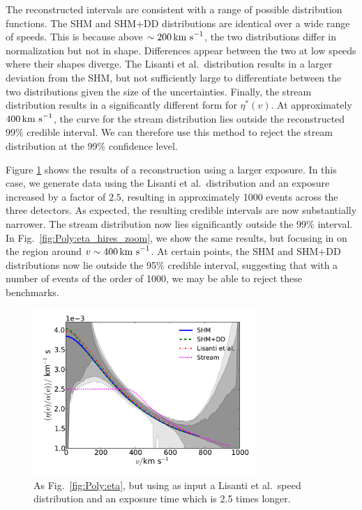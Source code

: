 The reconstructed intervals are consistent with a range of possible distribution functions. The SHM and SHM+DD distributions are identical over a wide range of speeds. This is because above $\sim 200 \,\textrm{km s}^{-1}$, the two distributions differ in normalization but not in shape. Differences appear between the two at low speeds where their shapes diverge. The Lisanti et al.\ distribution results in a larger deviation from the SHM, but not sufficiently large to differentiate between the two distributions given the size of the uncertainties. Finally, the stream distribution results in a significantly different form for $\eta^*(v)$. At approximately $400 \,\textrm{km s}^{-1}$, the curve for the stream distribution lies outside the reconstructed 99\% credible interval. We can therefore use this method to reject the stream distribution at the 99\% confidence level.

Figure \ref{fig:Poly:eta_hires} shows the results of a reconstruction using a larger exposure. In this case, we generate data using the Lisanti et al.\ distribution and an exposure increased by a factor of $2.5$, resulting in approximately 1000 events across the three detectors. As expected, the resulting credible intervals are now substantially narrower. The stream distribution now lies significantly outside the 99\% interval. In Fig.~\ref{fig:Poly:eta_hires_zoom}, we show the same results, but focusing in on the region around $v \sim 400 \,\textrm{km s}^{-1}$. At certain points, the SHM and SHM+DD distributions now lie outside the 95\% credible interval, suggesting that with a number of events of the order of 1000, we may be able to reject these benchmarks.

\begin{figure}[t]
\centering
  \includegraphics[width=0.75\textwidth]{Poly/LIS_hires.pdf}
  \caption{As Fig.~\ref{fig:Poly:eta}, but using as input a Lisanti et al.\ speed distribution and an exposure time which is 2.5 times longer.}
  \label{fig:Poly:eta_hires}
\end{figure}


